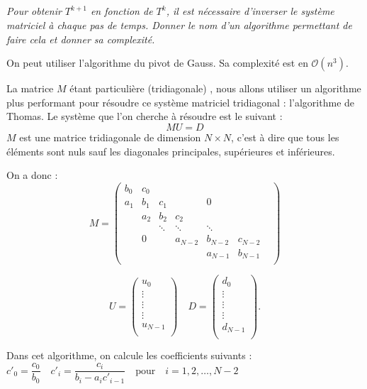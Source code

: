 \documentclass[10pt,fleqn]{article} %
\begin{document}
\begin{multicols}{2}
\subparagraph{}
\textit{Pour obtenir $T^{k+1}$ en fonction de $T^{k}$, il est nécessaire d'inverser le 
système matriciel à chaque pas de temps.
Donner le nom d'un algorithme permettant de faire cela et donner sa complexité.}

\ifprof
\begin{corrige}
On peut utiliser l'algorithme du pivot de Gauss. Sa complexité est en $\mathcal{O}(n^3)$.
\end{corrige}
\else
\fi

\ifprof
\else

\begin{obj}
La matrice $M$ étant particulière (tridiagonale) , nous allons utiliser un algorithme plus 
performant pour résoudre ce système matriciel tridiagonal : l'algorithme de Thomas.
 Le système que l'on cherche à résoudre est le suivant : 
$$
M U = D 
$$
$M$ est une matrice tridiagonale de dimension $N\times N$, c'est à dire que tous les éléments 
sont nuls sauf les diagonales principales, supérieures et inférieures. 
\end{obj}

On a donc : 
$$
M = 
\begin{pmatrix}
b_0 & c_0 &  &  &  &  & \\
a_1 & b_1 & c_1 & &0 & &\\
      & a_2 & b_2 & c_2 & & & \\
& & \ddots & \ddots & \ddots & \\
& 0& & a_{N-2} & b_{N-2} & c_{N-2}\\
& & & & a_{N-1} & b_{N-1}\\
\end{pmatrix}
$$

$$
U = \begin{pmatrix}
u_0 \\
\vdots \\
\vdots \\
\vdots  \\
u_{N-1} \\
\end{pmatrix}
\quad 
D = \begin{pmatrix}
d_0 \\
\vdots \\
\vdots \\
\vdots  \\
d_{N-1} \\
\end{pmatrix}.
$$

Dans cet algorithme, on calcule les coefficients suivants : 
$
c'_0 = \dfrac{c_0}{b_0} \quad c'_i = \dfrac{c_i}{b_i - a_i c'_{i-1}}  \quad \text{pour} \quad i=1,2,\ldots, N-2$


\end{multicols}
\end{document}

